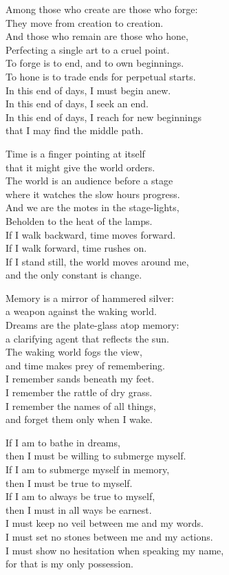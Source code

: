 Among those who create are those who forge:\\
They move from creation to creation.\\
And those who remain are those who hone,\\
Perfecting a single art to a cruel point.\\
To forge is to end, and to own beginnings.\\
To hone is to trade ends for perpetual starts.\\
In this end of days, I must begin anew.\\
In this end of days, I seek an end.\\
In this end of days, I reach for new beginnings\\
that I may find the middle path.

Time is a finger pointing at itself\\
that it might give the world orders.\\
The world is an audience before a stage\\
where it watches the slow hours progress.\\
And we are the motes in the stage-lights,\\
Beholden to the heat of the lamps.\\
If I walk backward, time moves forward.\\
If I walk forward, time rushes on.\\
If I stand still, the world moves around me,\\
and the only constant is change.

Memory is a mirror of hammered silver:\\
a weapon against the waking world.\\
Dreams are the plate-glass atop memory:\\
a clarifying agent that reflects the sun.\\
The waking world fogs the view,\\
and time makes prey of remembering.\\
I remember sands beneath my feet.\\
I remember the rattle of dry grass.\\
I remember the names of all things,\\
and forget them only when I wake.

If I am to bathe in dreams,\\
then I must be willing to submerge myself.\\
If I am to submerge myself in memory,\\
then I must be true to myself.\\
If I am to always be true to myself,\\
then I must in all ways be earnest.\\
I must keep no veil between me and my words.\\
I must set no stones between me and my actions.\\
I must show no hesitation when speaking my name,\\
for that is my only possession.

